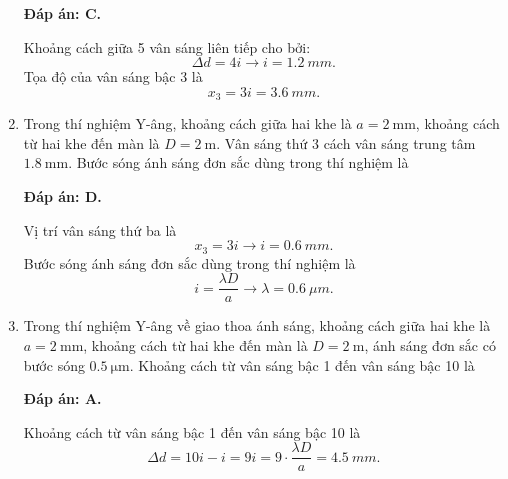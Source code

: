 \begin{enumerate}[label=\bfseries Câu \arabic*:]
	\loigiai
	{		\textbf{Đáp án: C.}
		
Khoảng cách giữa 5 vân sáng liên tiếp cho bởi:
$$
	\Delta d = 4i \rightarrow i = \SI{1,2}{mm}.
$$
Tọa độ của vân sáng bậc 3 là
$$
	x_{3} = 3i = \SI{3,6}{mm}.
$$
		
	}
	
\item {} 
		\cauhoi
	{Trong thí nghiệm Y-âng, khoảng cách giữa hai khe là $a=\SI{2}{\milli \meter}$, khoảng cách từ hai khe đến màn là $D=\SI{2}{\meter}$. Vân sáng thứ 3 cách vân sáng trung tâm $\SI{1.8}{\milli \meter}$. Bước sóng ánh sáng đơn sắc dùng trong thí nghiệm là
	}
	
	\loigiai
	{		\textbf{Đáp án: D.}
		
Vị trí vân sáng thứ ba là
$$
	x_{3} = 3i \rightarrow i = \SI{0,6}{mm}.
$$
Bước sóng ánh sáng đơn sắc dùng trong thí nghiệm là
$$
	i = \dfrac{\lambda D}{a} \rightarrow \lambda = \SI{0,6}{\mu m}.
$$
		
	}
	
\item {} 
	\cauhoi
	{Trong thí nghiệm Y-âng về giao thoa ánh sáng, khoảng cách giữa hai khe là $a=\SI{2}{\milli \meter}$, khoảng cách từ hai khe đến màn là $D=\SI{2}{\meter}$, ánh sáng đơn sắc có bước sóng $\SI{0.5}{\micro \meter}$. Khoảng cách từ vân sáng bậc 1 đến vân sáng bậc 10 là
	}
	
	\loigiai
	{		\textbf{Đáp án: A.}
		
Khoảng cách từ vân sáng bậc 1 đến vân sáng bậc 10 là
$$
	\Delta d = 10i - i = 9i = 9 \cdot \dfrac{\lambda D}{a} = \SI{4,5}{mm}.
$$
		
	}
	

\end{enumerate}
